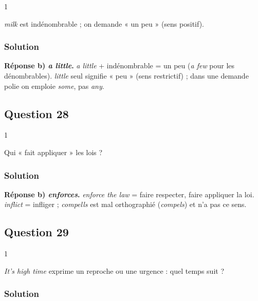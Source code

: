 \documentclass[11pt,a4paper]{article}
\begin{document}
\begin{indication}{1}

\emph{milk} est indénombrable ; on demande « un peu » (sens positif).

\end{indication}

\hypertarget{solution-26}{%
\subsubsection{Solution}\label{solution-26}}

\textbf{Réponse b) \emph{a little}.} \emph{a little} + indénombrable = un peu (\emph{a few} pour les dénombrables). \emph{little} seul signifie « peu » (sens restrictif) ; dans une demande polie on emploie \emph{some}, pas \emph{any}.

\hypertarget{question-28}{%
\subsection{Question 28}\label{question-28}}

\begin{indication}{1}

Qui « fait appliquer » les lois ?

\end{indication}

\hypertarget{solution-27}{%
\subsubsection{Solution}\label{solution-27}}

\textbf{Réponse b) \emph{enforces}.} \emph{enforce the law} = faire respecter, faire appliquer la loi. \emph{inflict} = infliger ; \emph{compells} est mal orthographié (\emph{compels}) et n'a pas ce sens.

\hypertarget{question-29}{%
\subsection{Question 29}\label{question-29}}

\begin{indication}{1}

\emph{It's high time} exprime un reproche ou une urgence : quel temps suit ?

\end{indication}

\hypertarget{solution-28}{%
\subsubsection{Solution}\label{solution-28}}
\end{document}
